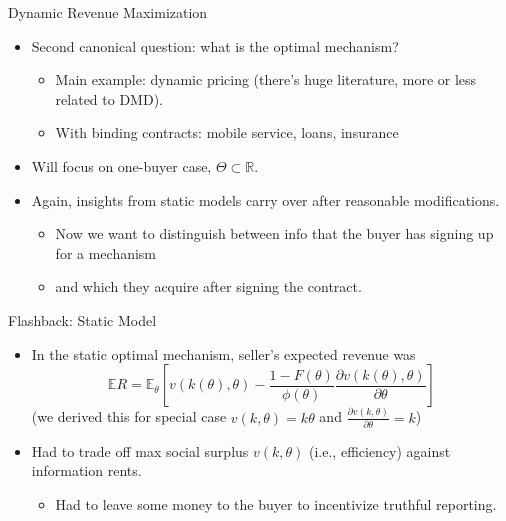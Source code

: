 \documentclass[english,10pt
,aspectratio=169
]{beamer}
\begin{document}
\begin{frame}{Dynamic Revenue Maximization}
\begin{itemize}
	\item Second canonical question: what is the optimal mechanism?
	\begin{itemize}
		\item Main example: dynamic pricing (there's huge literature, more or less related to DMD).
		\item With binding contracts: mobile service, loans, insurance
	\end{itemize}
	\item Will focus on one-buyer case, $\Theta \subset \mathbb{R}$.
	\item Again, insights from static models carry over after reasonable modifications.
	\begin{itemize}
		\item Now we want to distinguish between info that the buyer has  signing up for a mechanism
		\item and which they acquire \alert{after} signing the contract.
	\end{itemize}
\end{itemize}
\end{frame}


\begin{frame}{Flashback: Static Model}
\begin{itemize}
	\item In the static optimal mechanism, seller's expected revenue was
	$$ \mathbb{E}R = \mathbb{E}_\theta \left[ v(k(\theta),\theta) - \frac{1-F(\theta)}{\phi(\theta)} \frac{\partial v(k(\theta),\theta)}{\partial \theta} \right] $$
	(we derived this for special case $v(k,\theta) = k\theta$ and $\frac{\partial v(k,\theta)}{\partial \theta}=k$)
	\item Had to trade off max social surplus $v(k,\theta)$ (i.e., efficiency) against information rents.
	\begin{itemize}
		\item Had to leave some money to the buyer to incentivize truthful reporting.
	\end{itemize}
\end{itemize}
\end{frame}
\end{document}
